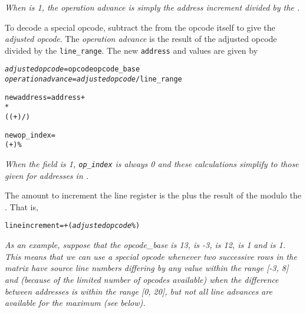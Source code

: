 \textit{When  is 1, 
the operation advance is simply the address increment divided by the
.}

To decode a special opcode, subtract the  from
the opcode itself to give the \textit{adjusted opcode}. 
The \textit{operation advance} 
is the result of the adjusted opcode divided by the
\texttt{line\_range}. The new \texttt{address} and 
 values are given by
\begin{alltt}
  \textit{adjusted opcode} = opcode \dash opcode\_base
  \textit{operation advance} = \textit{adjusted opcode} / line\_range

  new address = address +
     *
      (( + ) / )

  new op\_index =
    ( + ) \% 
\end{alltt}

\textit{When the  field is 1,
\texttt{op\_index} is always 0 and these calculations simplify to those
given for addresses in 
.}

The amount to increment the line register is the 
 plus
the result of the 
\textit{} modulo the 
. That
is,

\begin{alltt}
  line increment =  + (\textit{adjusted opcode} \% )
\end{alltt}

\textit{As an example, suppose that the opcode\_base is 13, 
 is -3, 
 is 12, 
 is 1
and 
 is 1. 
This means that
we can use a special opcode whenever two successive rows in
the matrix have source line numbers differing by any value
within the range [-3, 8] and (because of the limited number
of opcodes available) when the difference between addresses
is within the range [0, 20], but not all line advances are
available for the maximum  (see below).}

